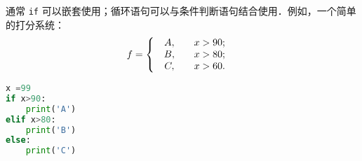 通常 \verb|if| 可以嵌套使用；循环语句可以与条件判断语句结合使用．例如，一个简单的打分系统：
\begin{equation}
f=\left\{\begin{array}{lc}\begin{array}{c}A, \\B, \\C, \end{array}&\begin{array}{c}x>90; \\x>80; \\x>60.\end{array}\end{array}\right.\\\\
\end{equation}
\begin{lstlisting}[language=python]
x =99
if x>90:
    print('A')
elif x>80:
    print('B')
else:
    print('C')
\end{lstlisting}
